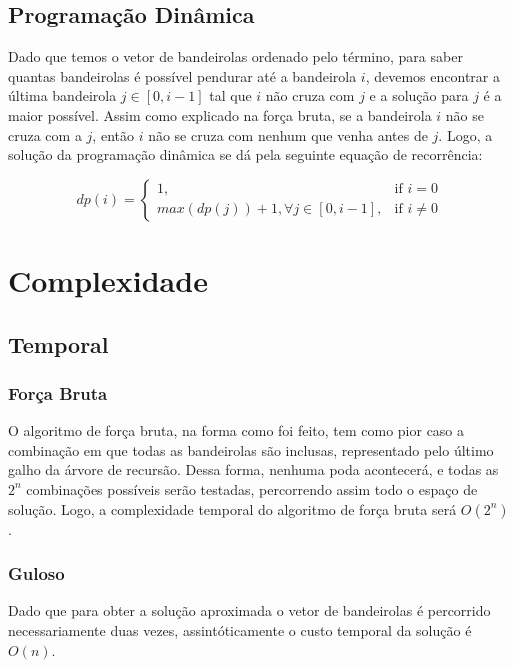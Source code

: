 \documentclass[
	12pt,
	a4paper,
	onepage,
	brazil
]{article}
\begin{document}
	\subsection{Programação Dinâmica}
	
	Dado que temos o vetor de bandeirolas ordenado pelo término, para saber quantas bandeirolas é possível pendurar até a bandeirola $i$, devemos encontrar a última bandeirola $j \in [0, i-1]$ tal que $i$ não cruza com $j$ e a solução para $j$ é a maior possível. Assim como explicado na força bruta, se a bandeirola $i$ não se cruza com a $j$, então $i$ não se cruza com nenhum que venha antes de $j$. Logo, a solução da programação dinâmica se dá pela seguinte equação de recorrência:
	
	\begin{equation}
		dp(i) = \begin{cases} 1, & \mbox{if } i = 0 \\ max(dp(j)) + 1, \forall j \in [0, i-1], & \mbox{if } i \ne 0\end{cases}
	\end{equation}
	
	\section{Complexidade}
	
	\subsection{Temporal}
	
	\subsubsection{Força Bruta}
	
	O algoritmo de força bruta, na forma como foi feito, tem como pior caso a combinação em que todas as bandeirolas são inclusas, representado pelo último galho da árvore de recursão. Dessa forma, nenhuma poda acontecerá, e todas as $2^n$ combinações possíveis serão testadas, percorrendo assim todo o espaço de solução. Logo, a complexidade temporal do algoritmo de força bruta será $O(2^n)$.

	\subsubsection{Guloso}
	
	Dado que para obter a solução aproximada o vetor de bandeirolas é percorrido necessariamente duas vezes, assintóticamente o custo temporal da solução é $O(n)$.
	
\end{document}
